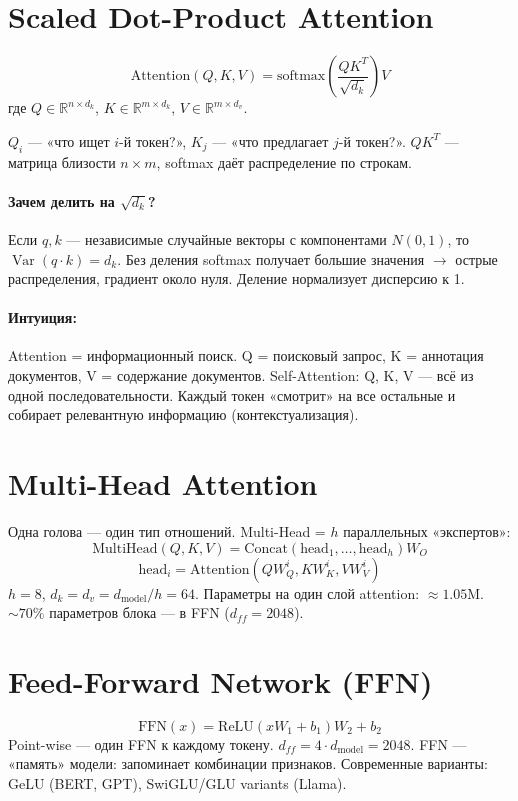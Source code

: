 \documentclass[a4paper,12pt]{article}
\begin{document}
\section{Scaled Dot-Product Attention}
\[
\text{Attention}(Q, K, V) = \text{softmax}\left(\frac{Q K^T}{\sqrt{d_k}}\right) V
\]
где $Q \in \mathbb{R}^{n \times d_k}$, $K \in \mathbb{R}^{m \times d_k}$, $V \in \mathbb{R}^{m \times d_v}$.

$Q_i$ — «что ищет $i$-й токен?», $K_j$ — «что предлагает $j$-й токен?». $QK^T$ — матрица близости $n \times m$, softmax даёт распределение по строкам.

\paragraph{Зачем делить на $\sqrt{d_k}$?}
Если $q, k$ — независимые случайные векторы с компонентами $N(0,1)$, то $\operatorname{Var}(q\cdot k) = d_k$. Без деления softmax получает большие значения $\to$ острые распределения, градиент около нуля. Деление нормализует дисперсию к 1.

\paragraph{Интуиция:} Attention = информационный поиск. Q = поисковый запрос, K = аннотация документов, V = содержание документов. Self-Attention: Q, K, V — всё из одной последовательности. Каждый токен «смотрит» на все остальные и собирает релевантную информацию (контекстуализация).

\section{Multi-Head Attention}

Одна голова — один тип отношений. Multi-Head = $h$ параллельных «экспертов»:
\[
\text{MultiHead}(Q, K, V) = \text{Concat}(\text{head}_1, \dots, \text{head}_h) W_O
\]
\[
\text{head}_i = \text{Attention}(Q W_Q^i, K W_K^i, V W_V^i)
\]
$h = 8$, $d_k = d_v = d_{\text{model}} / h = 64$. Параметры на один слой attention: $\approx 1.05$M. $\sim 70\%$ параметров блока — в FFN ($d_{ff} = 2048$).

\section{Feed-Forward Network (FFN)}
\[
\text{FFN}(x) = \text{ReLU}(x W_1 + b_1) W_2 + b_2
\]
Point-wise — один FFN к каждому токену. $d_{ff} = 4 \cdot d_{\text{model}} = 2048$. FFN — «память» модели: запоминает комбинации признаков. Современные варианты: GeLU (BERT, GPT), SwiGLU/GLU variants (Llama).
\end{document}
